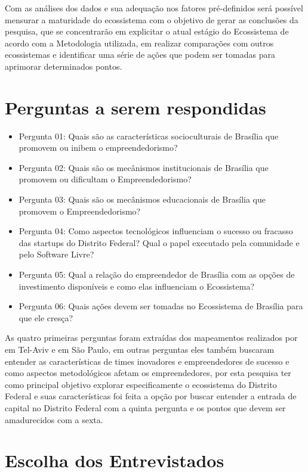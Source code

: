 Com as análises dos dados e sua adequação nos fatores pré-definidos será possível mensurar a maturidade do ecossistema com o objetivo de gerar as conclusões da pesquisa, que se concentrarão em explicitar o atual estágio do Ecossistema de acordo com a Metodologia utilizada, em realizar comparações com outros ecossistemas e identificar uma série de ações que podem ser tomadas para aprimorar determinados pontos.

\section{Perguntas a serem respondidas}
\label{subsection:questoes_de_pesquisa}

\begin{itemize}
  \item Pergunta 01: Quais são as características socioculturais de Brasília que promovem ou inibem o empreendedorismo?
  \item Pergunta 02: Quais são os mecânismos institucionais de Brasília que promovem ou dificultam o Empreendedorismo?
  \item Pergunta 03: Quais são os mecânismos educacionais de Brasília que promovem o Empreendedorismo?
  \item Pergunta 04: Como aspectos tecnológicos influenciam o sucesso ou fracasso das startups do Distrito Federal? Qual o papel executado pela comunidade e pelo Software Livre?
  \item Pergunta 05: Qual a relação do empreendedor de Brasília com as opções de investimento disponíveis e como elas influenciam o Ecossistema?
  \item Pergunta 06: Quais ações devem ser tomadas no Ecossistema de Brasília para que ele cresça?
\end{itemize}

As quatro primeiras perguntas foram extraídas dos mapeamentos realizados por  em Tel-Aviv e  em São Paulo, em outras perguntas eles também buscaram entender as características de times inovadores e empreendedores de sucesso e como aspectos metodológicos afetam os empreendedores, por esta pesquisa ter como principal objetivo explorar especificamente o ecossistema do Distrito Federal e suas características foi feita a opção por buscar entender a entrada de capital no Distrito Federal com a quinta pergunta e os pontos que devem ser amadurecidos com a sexta.

\section{Escolha dos Entrevistados}
\label{subsection:escolha_dos_entrevistados}

